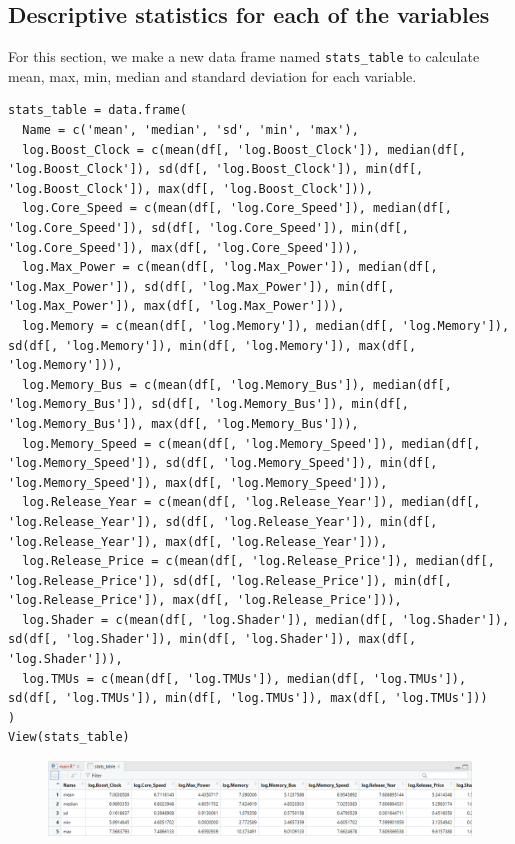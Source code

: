 \documentclass[a4paper]{article}
\begin{document}
\subsection{Descriptive statistics for each of the variables}
For this section, we make a new data frame named \verb|stats_table| to calculate mean, max, min, median and standard deviation for each variable. 
\begin{mdframed}[leftline=false,rightline=false,backgroundcolor=lightblue!10,nobreak=false]
    \begin{verbatim}
stats_table = data.frame(
  Name = c('mean', 'median', 'sd', 'min', 'max'),
  log.Boost_Clock = c(mean(df[, 'log.Boost_Clock']), median(df[, 'log.Boost_Clock']), sd(df[, 'log.Boost_Clock']), min(df[, 'log.Boost_Clock']), max(df[, 'log.Boost_Clock'])),
  log.Core_Speed = c(mean(df[, 'log.Core_Speed']), median(df[, 'log.Core_Speed']), sd(df[, 'log.Core_Speed']), min(df[, 'log.Core_Speed']), max(df[, 'log.Core_Speed'])),
  log.Max_Power = c(mean(df[, 'log.Max_Power']), median(df[, 'log.Max_Power']), sd(df[, 'log.Max_Power']), min(df[, 'log.Max_Power']), max(df[, 'log.Max_Power'])),
  log.Memory = c(mean(df[, 'log.Memory']), median(df[, 'log.Memory']), sd(df[, 'log.Memory']), min(df[, 'log.Memory']), max(df[, 'log.Memory'])),
  log.Memory_Bus = c(mean(df[, 'log.Memory_Bus']), median(df[, 'log.Memory_Bus']), sd(df[, 'log.Memory_Bus']), min(df[, 'log.Memory_Bus']), max(df[, 'log.Memory_Bus'])),
  log.Memory_Speed = c(mean(df[, 'log.Memory_Speed']), median(df[, 'log.Memory_Speed']), sd(df[, 'log.Memory_Speed']), min(df[, 'log.Memory_Speed']), max(df[, 'log.Memory_Speed'])),
  log.Release_Year = c(mean(df[, 'log.Release_Year']), median(df[, 'log.Release_Year']), sd(df[, 'log.Release_Year']), min(df[, 'log.Release_Year']), max(df[, 'log.Release_Year'])),
  log.Release_Price = c(mean(df[, 'log.Release_Price']), median(df[, 'log.Release_Price']), sd(df[, 'log.Release_Price']), min(df[, 'log.Release_Price']), max(df[, 'log.Release_Price'])),
  log.Shader = c(mean(df[, 'log.Shader']), median(df[, 'log.Shader']), sd(df[, 'log.Shader']), min(df[, 'log.Shader']), max(df[, 'log.Shader'])),
  log.TMUs = c(mean(df[, 'log.TMUs']), median(df[, 'log.TMUs']), sd(df[, 'log.TMUs']), min(df[, 'log.TMUs']), max(df[, 'log.TMUs']))
)
View(stats_table)
    \end{verbatim}
\end{mdframed}
\begin{figure}[H]
    \centering
    \includegraphics[keepaspectratio, width=1\textwidth, height=1\textheight]{Visualization/Descriptive/2.png}
\end{figure}
\end{document}
